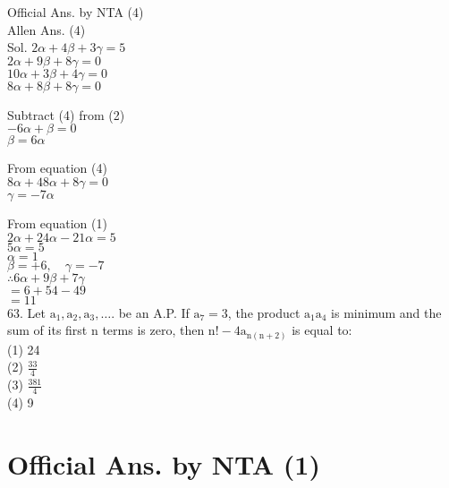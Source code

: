 \documentclass[10pt]{article}
\begin{document}
Official Ans. by NTA (4)\\
Allen Ans. (4)\\
Sol. \(2 \alpha+4 \beta+3 \gamma=5\)\\
\(2 \alpha+9 \beta+8 \gamma=0\)\\
\(10 \alpha+3 \beta+4 \gamma=0\)\\
\(8 \alpha+8 \beta+8 \gamma=0\)

Subtract (4) from (2)\\
\(-6 \alpha+\beta=0\)\\
\(\beta=6 \alpha\)

From equation (4)\\
\(8 \alpha+48 \alpha+8 \gamma=0\)\\
\(\gamma=-7 \alpha\)

From equation (1)\\
\(2 \alpha+24 \alpha-21 \alpha=5\)\\
\(5 \alpha=5\)\\
\(\alpha=1\)\\
\(\beta=+6, \quad \gamma=-7\)\\
\(\therefore 6 \alpha+9 \beta+7 \gamma\)\\
\(=6+54-49\)\\
\(=11\)\\
63. Let \(\mathrm{a}_{1}, \mathrm{a}_{2}, \mathrm{a}_{3}, \ldots\). be an A.P. If \(\mathrm{a}_{7}=3\), the product \(\mathrm{a}_{1} \mathrm{a}_{4}\) is minimum and the sum of its first n terms is zero, then \(\mathrm{n}!-4 \mathrm{a}_{\mathrm{n}(\mathrm{n}+2)}\) is equal to:\\
(1) 24\\
(2) \(\frac{33}{4}\)\\
(3) \(\frac{381}{4}\)\\
(4) 9

\section*{Official Ans. by NTA (1)}
\end{document}
